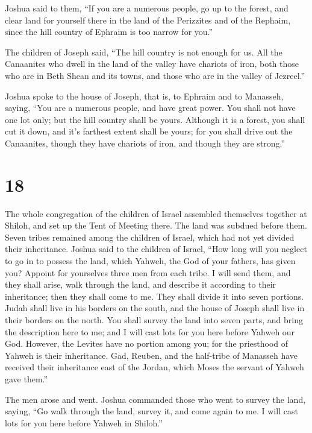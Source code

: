  Joshua said to them, ``If you are a numerous people, go
up to the forest, and clear land for yourself there in the land of the
Perizzites and of the Rephaim, since the hill country of Ephraim is too
narrow for you.''

 The children of Joseph said, ``The hill country is not
enough for us. All the Canaanites who dwell in the land of the valley
have chariots of iron, both those who are in Beth Shean and its towns,
and those who are in the valley of Jezreel.''

 Joshua spoke to the house of Joseph, that is, to Ephraim
and to Manasseh, saying, ``You are a numerous people, and have great
power. You shall not have one lot only;  but the hill
country shall be yours. Although it is a forest, you shall cut it down,
and it's farthest extent shall be yours; for you shall drive out the
Canaanites, though they have chariots of iron, and though they are
strong.''

\hypertarget{section-17}{%
\section{18}\label{section-17}}

 The whole congregation of the children of Israel
assembled themselves together at Shiloh, and set up the Tent of Meeting
there. The land was subdued before them.  Seven tribes
remained among the children of Israel, which had not yet divided their
inheritance.  Joshua said to the children of Israel, ``How
long will you neglect to go in to possess the land, which Yahweh, the
God of your fathers, has given you?  Appoint for
yourselves three men from each tribe. I will send them, and they shall
arise, walk through the land, and describe it according to their
inheritance; then they shall come to me.  They shall
divide it into seven portions. Judah shall live in his borders on the
south, and the house of Joseph shall live in their borders on the north.
 You shall survey the land into seven parts, and bring the
description here to me; and I will cast lots for you here before Yahweh
our God.  However, the Levites have no portion among you;
for the priesthood of Yahweh is their inheritance. Gad, Reuben, and the
half-tribe of Manasseh have received their inheritance east of the
Jordan, which Moses the servant of Yahweh gave them.''

 The men arose and went. Joshua commanded those who went
to survey the land, saying, ``Go walk through the land, survey it, and
come again to me. I will cast lots for you here before Yahweh in
Shiloh.''

